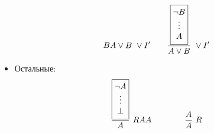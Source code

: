 \documentclass[10pt,a4paper]{article}
\DeclareRobustCommand{\rvdots}{%
    \vphantom{\int\limits^x}\smash[t]{\vdots}
}
\begin{document}
\begin{itemize}
\[{{\begin{matrix}
            B
    \end{matrix}}}{A \lor B}\ \lor I'
    \qquad 
    \frac{\boxed{\begin{matrix}
            \neg B \\
            \rvdots \\
            A
    \end{matrix}}}{A \lor B}\ \lor I'
    \]
    \item Остальные:
    \[
    \frac{\boxed{\begin{matrix}
            \neg A \\
            \rvdots \\
            \bot
    \end{matrix}}}{A}\ RAA
    \qquad \qquad 
    \frac{A}{A}\ R
    \]
\end{itemize}
\end{document}
